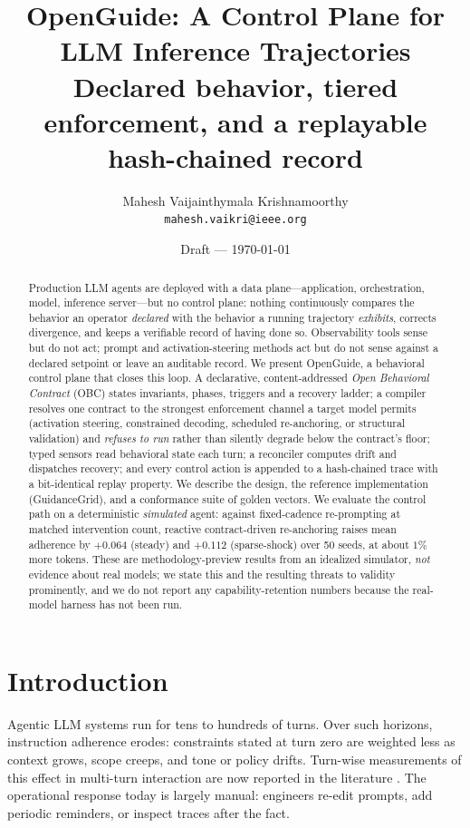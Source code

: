 \documentclass[11pt]{article}
\title{\textbf{OpenGuide: A Control Plane for LLM Inference Trajectories}\\[2pt]
\large Declared behavior, tiered enforcement, and a replayable hash-chained record}
\author{Mahesh Vaijainthymala Krishnamoorthy\\\small\texttt{mahesh.vaikri@ieee.org}}
\date{Draft --- \today}
\newcommand{\sys}{OpenGuide}
\newcommand{\rt}{GuidanceGrid}
\newcommand{\obc}{OBC}
\begin{document}
\maketitle

\begin{abstract}
Production LLM agents are deployed with a data plane---application, orchestration,
model, inference server---but no control plane: nothing continuously compares the
behavior an operator \emph{declared} with the behavior a running trajectory
\emph{exhibits}, corrects divergence, and keeps a verifiable record of having done
so. Observability tools sense but do not act; prompt and activation-steering
methods act but do not sense against a declared setpoint or leave an auditable
record. We present \sys, a behavioral control plane that closes this loop. A
declarative, content-addressed \emph{Open Behavioral Contract} (\obc) states
invariants, phases, triggers and a recovery ladder; a compiler resolves one
contract to the strongest enforcement channel a target model permits (activation
steering, constrained decoding, scheduled re-anchoring, or structural validation)
and \emph{refuses to run} rather than silently degrade below the contract's floor;
typed sensors read behavioral state each turn; a reconciler computes drift and
dispatches recovery; and every control action is appended to a hash-chained trace
with a bit-identical replay property. We describe the design, the reference
implementation (\rt), and a conformance suite of golden vectors. We evaluate the
control path on a deterministic \emph{simulated} agent: against fixed-cadence
re-prompting at matched intervention count, reactive contract-driven re-anchoring
raises mean adherence by $+0.064$ (steady) and $+0.112$ (sparse-shock) over 50
seeds, at about $1\%$ more tokens. These are methodology-preview results from an
idealized simulator, \emph{not} evidence about real models; we state this and the
resulting threats to validity prominently, and we do not report any
capability-retention numbers because the real-model harness has not been run.
\end{abstract}

\section{Introduction}
\label{sec:intro}

Agentic LLM systems run for tens to hundreds of turns. Over such horizons,
instruction adherence erodes: constraints stated at turn zero are weighted less
as context grows, scope creeps, and tone or policy drifts. Turn-wise measurements
of this effect in multi-turn interaction are now reported in the literature
\citep{dongre2025drift}. The operational response today is largely manual:
engineers re-edit prompts, add periodic reminders, or inspect traces after the
fact.
\end{document}

